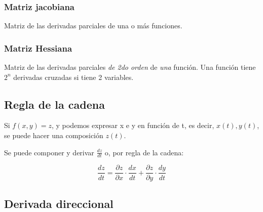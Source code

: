 \subsubsection{Matriz jacobiana}

Matriz de las derivadas parciales de una o más funciones.

\subsubsection{Matriz Hessiana}

Matriz de las derivadas parciales \textit{de 2do orden}
de \textit{una} función.
Una función tiene \(2^{n}\) derivadas cruzadas si tiene 2 variables.

\subsection{Regla de la cadena}

Si \(f(x,y) = z\),
y podemos expresar x e y en función de t,
es decir, \(x(t), y(t)\),
se puede hacer una composición \(z(t)\).

Se puede componer y derivar \(\frac{dz}{dt}\) o, por regla de la cadena:

\begin{equation*}
    \frac{dz}{dt} = \frac{\partial z}{\partial x}\cdot\frac{dx}{dt} + \frac{\partial z}{\partial y}\cdot\frac{dy}{dt}
\end{equation*}

\subsection{Derivada direccional}


